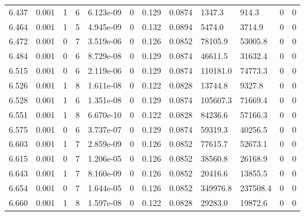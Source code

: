\documentclass[preview]{standalone}
\begin{document}
{{{{{{{\begin{tabular}{L{1.2cm}C{1.2cm} C{0.3cm}C{0.5cm} C{1.4cm}C{1.4cm} C{1.4cm}C{1.4cm} C{1.6cm}C{1.6cm} C{1.6cm}C{1.6cm}}
  6.437  &  0.001  & 1     &  6 &  6.123e-09  & 0  &  0.129&   0.0874& 1347.3 & 914.3   &  0 & 0  \\ 
  6.464  &  0.001  & 1     &  5 &  4.945e-09  & 0  &  0.132&   0.0894& 5474.0 & 3714.9   &  0 & 0  \\ 
  6.472  &  0.001  & 0     &  7 &  3.519e-06  & 0  &  0.126&   0.0852& 78105.9 & 53005.8   &  0 & 0  \\ 
  6.484  &  0.001  & 0     &  6 &  8.729e-08  & 0  &  0.129&   0.0874& 46611.5 & 31632.4   &  0 & 0  \\ 
  6.515  &  0.001  & 0     &  6 &  2.119e-06  & 0  &  0.129&   0.0874& 110181.0 & 74773.3   &  0 & 0  \\ 
  6.526  &  0.001  & 1     &  8 &  1.611e-08  & 0  &  0.122&   0.0828& 13744.8 & 9327.8   &  0 & 0  \\ 
  6.528  &  0.001  & 1     &  6 &  1.351e-08  & 0  &  0.129&   0.0874& 105607.3 & 71669.4   &  0 & 0  \\ 
  6.551  &  0.001  & 1     &  8 &  6.670e-10  & 0  &  0.122&   0.0828& 84236.6 & 57166.3   &  0 & 0  \\ 
  6.575  &  0.001  & 0     &  6 &  3.737e-07  & 0  &  0.129&   0.0874& 59319.3 & 40256.5   &  0 & 0  \\ 
  6.603  &  0.001  & 1     &  7 &  2.859e-09  & 0  &  0.126&   0.0852& 77615.7 & 52673.1   &  0 & 0  \\ 
  6.615  &  0.001  & 0     &  7 &  1.206e-05  & 0  &  0.126&   0.0852& 38560.8 & 26168.9   &  0 & 0  \\ 
  6.643  &  0.001  & 1     &  7 &  8.160e-09  & 0  &  0.126&   0.0852& 20416.6 & 13855.5   &  0 & 0  \\ 
  6.654  &  0.001  & 0     &  7 &  1.644e-05  & 0  &  0.126&   0.0852& 349976.8 & 237508.4   &  0 & 0  \\ 
  6.660  &  0.001  & 1     &  8 &  1.597e-08  & 0  &  0.122&   0.0828& 29283.0 & 19872.6   &  0 & 0  \\ 
\hline 
\end{tabular} 

}}}}}}}
\end{document}
